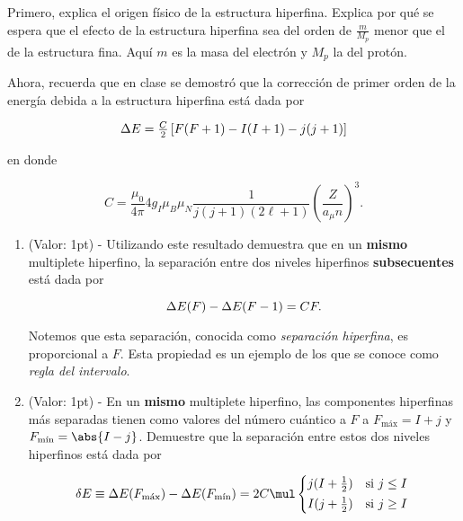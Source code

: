 \documentclass[./../main.tex]{subfiles}
\begin{document}
    \begin{exercise}
        Primero, explica el origen físico de la estructura hiperfina. Explica por qué se espera que el efecto de la estructura hiperfina sea del orden de \(\tfrac{m}{M_{p}}\) menor que el de la estructura fina. Aquí \(m\) es la masa del electrón y \(M_{p}\) la del protón.
        
        Ahora, recuerda que en clase se demostró que la corrección de primer orden de la energía debida a la estructura hiperfina está dada por

        \begin{equation*}
            \change{E} = \tfrac{C}{2}\left[F(F + 1) - I(I + 1) - j(j + 1)\right]
        \end{equation*}

        en donde

        \begin{equation*}
            C = \dfrac{\mu_{0}}{4\pi}4g_{I}\mu_{B}\mu_{N}\dfrac{1}{j(j + 1)(2\ell + 1)}\left(\dfrac{Z}{a_{\mu}n}\right)^{3}.
        \end{equation*}

        \begin{enumerate}
            \item (Valor: 1pt) - Utilizando este resultado demuestra que en un \textbf{mismo} multiplete hiperfino, la separación entre dos niveles hiperfinos \textbf{subsecuentes} está dada por
            
            \begin{equation*}
                \change{E}(F) - \change{E}(F - 1) = CF.
            \end{equation*}

            Notemos que esta separación, conocida como \emph{separación hiperfina}, es proporcional a \(F\). Esta propiedad es un ejemplo de los que se conoce como \emph{regla del intervalo}.

            \item (Valor: 1pt) - En un \textbf{mismo} multiplete hiperfino, las componentes hiperfinas más separadas tienen como valores del número cuántico a \(F\) a \(F_{\text{máx}} = I + j\) y \(F_{\text{mín}} = \abs{I - j}\). Demuestre que la separación entre estos dos niveles hiperfinos está dada por
            
            \begin{equation*}
                \fdif{E} \equiv \adif{E}(F_{\text{máx}}) - \adif{E}(F_{\text{mín}}) = 2C \mul \begin{dcases*}
                    j(I + \tfrac{1}{2}) & si \(j \leq I\)\\
                    I(j + \tfrac{1}{2}) & si \(j \geq I\)
                \end{dcases*} 
            \end{equation*}
            

\end{enumerate}
\end{exercise}
\end{document}
